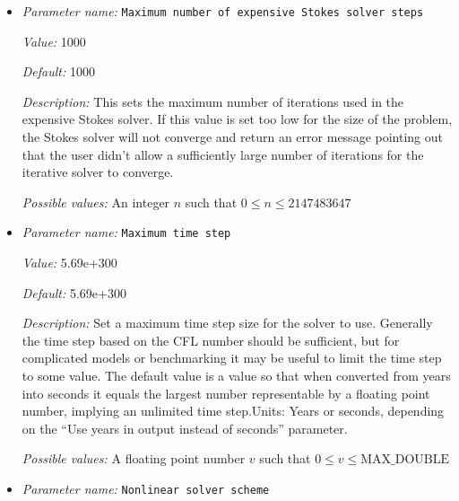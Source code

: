 \begin{itemize}
{\it Value:} 2147483647


{\it Default:} 2147483647


{\it Description:} The maximal number of nonlinear iterations to be performed in the pre-refinement steps. This does not include the last refinement step before moving to timestep 1. When this parameter has a larger value than max nonlinear iterations, the latter is used.


{\it Possible values:} An integer $n$ such that $0\leq n \leq 2147483647$
\item {\it Parameter name:} {\tt Maximum number of expensive Stokes solver steps}
\label{parameters:Maximum number of expensive Stokes solver steps}


{\it Value:} 1000


{\it Default:} 1000


{\it Description:} This sets the maximum number of iterations used in the expensive Stokes solver. If this value is set too low for the size of the problem, the Stokes solver will not converge and return an error message pointing out that the user didn't allow a sufficiently large number of iterations for the iterative solver to converge.


{\it Possible values:} An integer $n$ such that $0\leq n \leq 2147483647$
\item {\it Parameter name:} {\tt Maximum time step}
\label{parameters:Maximum time step}


{\it Value:} 5.69e+300


{\it Default:} 5.69e+300


{\it Description:} Set a maximum time step size for the solver to use. Generally the time step based on the CFL number should be sufficient, but for complicated models or benchmarking it may be useful to limit the time step to some value. The default value is a value so that when converted from years into seconds it equals the largest number representable by a floating point number, implying an unlimited time step.Units: Years or seconds, depending on the ``Use years in output instead of seconds'' parameter.


{\it Possible values:} A floating point number $v$ such that $0 \leq v \leq \text{MAX\_DOUBLE}$
\item {\it Parameter name:} {\tt Nonlinear solver scheme}
\label{parameters:Nonlinear solver scheme}



\end{itemize}

